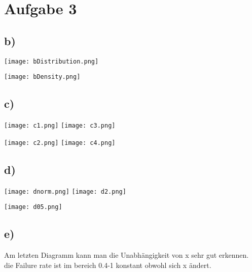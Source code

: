 \newpage
	\section*{Aufgabe 3}
	\graphicspath{{D:/GoogleDrive/UNI/SZS/Blatt1/3/}{D:/GoogleDrive/UNI/SZS/Blatt1/4/}}

\subsection*{b)}

\begin{minipage}[h]{0.5\textwidth}
	\centering
	\texttt{[image: bDistribution.png]} 	
\end{minipage}\begin{minipage}[h]{0.5\textwidth}
	\centering
	\texttt{[image: bDensity.png]}
\end{minipage}

\subsection*{c)}

\begin{minipage}[h]{0.5\textwidth}
	\centering
	\texttt{[image: c1.png]} 
	\texttt{[image: c3.png]} 		
\end{minipage}\begin{minipage}[h]{0.5\textwidth}
	\centering
	\texttt{[image: c2.png]}
	\texttt{[image: c4.png]} 	
\end{minipage}

\subsection*{d)}
\begin{minipage}[h]{0.5\textwidth}
	\centering
	\texttt{[image: dnorm.png]}
	\texttt{[image: d2.png]}		
\end{minipage}\begin{minipage}[h]{0.5\textwidth}
	\centering
	\texttt{[image: d05.png]} 	
\end{minipage}

\subsection*{e)}
Am letzten Diagramm kann man die Unabhängigkeit von x sehr gut erkennen.
die Failure rate ist im bereich 0.4-1 konstant obwohl sich x ändert.

